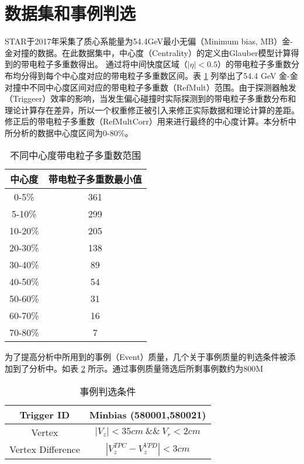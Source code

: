 \section{数据集和事例判选}
STAR于2017年采集了质心系能量为54.4GeV最小无偏（Minimum bias, MB）金-金对撞的数据。在此数据集中，中心度（Centrality）的定义由Glauber模型计算得到的带电粒子多重数得出。  通过将中间快度区域（$|\eta| < 0.5 $）的带电粒子多重数分布均分得到每个中心度对应的带电粒子多重数区间。表 \ref{tab:centrality} 列举出了54.4 GeV 金-金对撞中不同中心度区间对应的带电粒子多重数（RefMult）范围。由于探测器触发（Triggeer）效率的影响，当发生偏心碰撞时实际探测到的带电粒子多重数分布和理论计算存在差异，所以一个权重修正被引入来修正实际数据和理论计算的差距。修正后的带电粒子多重数（RefMultCorr）用来进行最终的中心度计算。本分析中所分析的数据中心度区间为0-80\%。

\begin{table}[h!]
    \centering
    \caption{不同中心度带电粒子多重数范围}
    \label{tab:centrality}
    \begin{tabular}{|c|c|}
    \hline
        中心度 & 带电粒子多重数最小值  \\
    \hline
         0-5\% & 361  \\
     \hline
         5-10\% & 299  \\
    \hline
         10-20\% & 205  \\
    \hline
         20-30\% & 138  \\
    \hline
         30-40\% & 89  \\
    \hline
         40-50\% & 54  \\
    \hline
         50-60\% & 31  \\
    \hline
         60-70\% & 16  \\
    \hline
         70-80\% & 7   \\     
    \hline
    \end{tabular}
\end{table}

为了提高分析中所用到的事例（Event）质量，几个关于事例质量的判选条件被添加到了分析中。如表 \ref{tab:EventSelection} 所示。通过事例质量筛选后所剩事例数约为800M

\begin{table}[h!]
    \centering
    \caption{事例判选条件}
    \label{tab:EventSelection}
    \begin{tabular}{|c|c|}
        \hline
        Trigger ID & Minbias (580001,580021)  \\
        \hline
        Vertex & $|V_z| < 35cm ~\&\&~ V_r < 2cm$   \\
        \hline
        Vertex Difference & $|V_{z}^{TPC} - V_{z}^{VPD}| < 3cm$\\
        \hline
    \end{tabular}
\end{table}
